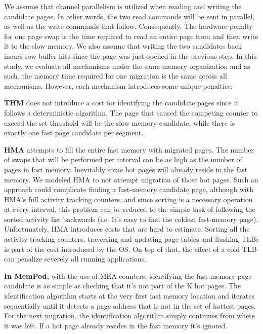 We assume that channel parallelism is utilized when reading and writing the candidate pages. In other words, the two read commands will be sent in parallel, as well as the write commands that follow. Consequently, The hardware penalty for one page swap is the time required to read an entire page from and then write it to the slow memory. We also assume that writing the two candidates back incurs row buffer hits since the page was just opened in the previous step. In this study, we evaluate all mechanisms under the same memory organization and as such, the memory time required for one migration is the same across all mechanisms. However, each mechanism introduces some unique penalties:

	\textbf{THM} does not introduce a cost for identifying the candidate pages since it follows a deterministic algorithm. The page that caused the competing counter to exceed the set threshold will be the slow memory candidate, while there is exactly one fast page candidate per segment.
	
    \textbf{HMA } attempts to fill the entire fast memory with migrated pages. The number of swaps that will be performed per interval can be as high as the number of pages in fast memory. Inevitably some hot pages will already reside in the fast memory. We modeled HMA to not attempt migration of those hot pages. Such an approach could complicate finding a fast-memory candidate page, although with HMA's full activity tracking counters, and since sorting is a necessary operation at every interval, this problem can be reduced to the simple task of following the sorted activity list backwards (i.e. It's easy to find the coldest fast-memory page). Unfortunately, HMA introduces costs that are hard to estimate. Sorting all the activity tracking counters, traversing and updating page tables and flushing TLBs is part of the cost introduced by the OS. On top of that, the effect of a cold TLB can penalize severely all running applications.
	
    \textbf{In MemPod,} with the use of MEA counters, identifying the fast-memory page candidate is as simple as checking that it's not part of the K hot pages. The identification algorithm starts at the very first fast memory location and iterates sequentially until it detects a page address that is not in the set of hottest pages. For the next migration, the identification algorithm simply continues from where it was left. If a hot page already resides in the fast memory it's ignored.

